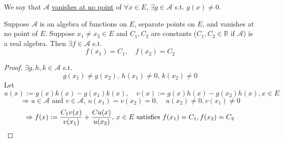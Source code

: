 We say that  $  \mathscr{A } $ \underline{vanishes at no point} of  $ \forall x\in E  $,  $ \exists g\in \mathscr{A} $ s.t. $ g(x)\not=0 $.
\begin{theorem}
    Suppose  $  \mathscr{A } $ is an algebra of functions on  $ E  $, separate points on  $ E  $, and vanishes at no point of  $ E  $. Suppose  $ x_1\not=x_2\in E  $ and  $ C_1,C_2  $ are constants  ($ C_1,C_2\in \mathbb{R} $ if  $  \mathscr{A } $) is a real algebra. Then  $ \exists f\in  \mathscr{A } $ s.t.
    \[f(x_1)=C_1,\quad f(x_2)=C_2\] 
\end{theorem}  
\begin{proof}
     $ \exists g,h,k\in  \mathscr{A }$ s.t.
     \[g(x_1)\not=g(x_2),\,h(x_1)\not=0,\,k(x_2)\not=0\]
     Let 
     $ u(x):=g(x)k(x)-g(x_1)k(x),\quad v(x):=g(x)h(x)-g(x_2)h(x),x\in E $ 
     \[\Rightarrow u\in  \mathscr{A }\text{ and }v\in  \mathscr{A },\, u(x_1)=v(x_2)=0,\quad u(x_2)\not=0,v(x_1)\not=0\]
     \[\Rightarrow f(x):=\dfrac{C_1v(x)}{v(x_1)}+\dfrac{Cu(x)}{u(x_2)},\,x\in E \text{ satisfies }f(x_1)=C_1,f(x_2)=C_2\qedhere\]
\end{proof}